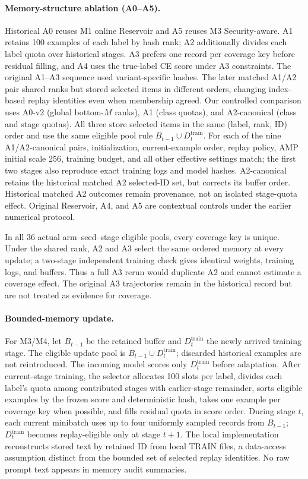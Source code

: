 \documentclass[conference]{IEEEtran}
\begin{document}
\paragraph{Memory-structure ablation (A0--A5).}
Historical A0 reuses M1 online Reservoir and A5 reuses M3 Security-aware. A1 retains 100 examples of each label by hash rank; A2 additionally divides each label quota over historical stages. A3 prefers one record per coverage key before residual filling, and A4 uses the true-label CE score under A3 constraints. The original A1--A3 sequence used variant-specific hashes. The later matched A1/A2 pair shared ranks but stored selected items in different orders, changing index-based replay identities even when membership agreed. Our controlled comparison uses A0-v2 (global bottom-$M$ ranks), A1 (class quotas), and A2-canonical (class and stage quotas). All three store selected items in the same (label, rank, ID) order and use the same eligible pool rule $B_{t-1}\cup D_t^{\mathrm{train}}$. For each of the nine A1/A2-canonical pairs, initialization, current-example order, replay policy, AMP initial scale 256, training budget, and all other effective settings match; the first two stages also reproduce exact training logs and model hashes. A2-canonical retains the historical matched A2 selected-ID set, but corrects its buffer order. Historical matched A2 outcomes remain provenance, not an isolated stage-quota effect. Original Reservoir, A4, and A5 are contextual controls under the earlier numerical protocol.

In all 36 actual arm--seed--stage eligible pools, every coverage key is unique. Under the shared rank, A2 and A3 select the same ordered memory at every update; a two-stage independent training check gives identical weights, training logs, and buffers. Thus a full A3 rerun would duplicate A2 and cannot estimate a coverage effect. The original A3 trajectories remain in the historical record but are not treated as evidence for coverage.

\paragraph{Bounded-memory update.}
For M3/M4, let $B_{t-1}$ be the retained buffer and $D_t^{\mathrm{train}}$ the newly arrived training stage. The eligible update pool is $B_{t-1}\cup D_t^{\mathrm{train}}$; discarded historical examples are not reintroduced. The incoming model scores only $D_t^{\mathrm{train}}$ before adaptation. After current-stage training, the selector allocates 100 slots per label, divides each label's quota among contributed stages with earlier-stage remainder, sorts eligible examples by the frozen score and deterministic hash, takes one example per coverage key when possible, and fills residual quota in score order. During stage $t$, each current minibatch uses up to four uniformly sampled records from $B_{t-1}$; $D_t^{\mathrm{train}}$ becomes replay-eligible only at stage $t+1$. The local implementation reconstructs stored text by retained ID from local TRAIN files, a data-access assumption distinct from the bounded set of selected replay identities. No raw prompt text appears in memory audit summaries.
\end{document}
